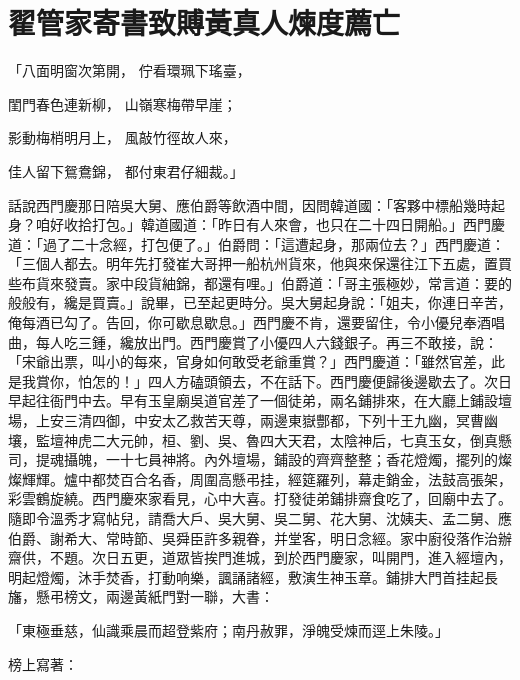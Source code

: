 %

\chapter{翟管家寄書致賻\KG 黃真人煉度薦亡}


\begin{showcontents}{}




「八面明窗次第開，  佇看環珮下瑤臺，

閨門春色連新柳，  山嶺寒梅帶早崖；

影動梅梢明月上，  風敲竹徑故人來，

佳人留下鴛鴦錦，  都付東君仔細裁。」

話說西門慶那日陪吳大舅、應伯爵等飲酒中間，因問韓道國：「客夥中標船幾時起身？咱好收拾打包。」韓道國道：「昨日有人來會，也只在二十四日開船。」西門慶道：「過了二十念經，打包便了。」伯爵問：「這遭起身，那兩位去？」西門慶道：「三個人都去。明年先打發崔大哥押一船杭州貨來，他與來保還往江下五處，置買些布貨來發賣。家中段貨紬錦，都還有哩。」伯爵道：「哥主張極妙，常言道：要的般般有，纔是買賣。」說畢，已至起更時分。吳大舅起身說：「姐夫，你連日辛苦，俺每酒已勾了。告回，你可歇息歇息。」西門慶不肯，還要留住，令小優兒奉酒唱曲，每人吃三鍾，纔放出門。西門慶賞了小優四人六錢銀子。再三不敢接，說：「宋爺出票，叫小的每來，官身如何敢受老爺重賞？」西門慶道：「雖然官差，此是我賞你，怕怎的！」四人方磕頭領去，不在話下。西門慶便歸後邊歇去了。次日早起往衙門中去。早有玉皇廟吳道官差了一個徒弟，兩名鋪排來，在大廳上鋪設壇場，上安三清四御，中安太乙救苦天尊，兩邊東嶽酆都，下列十王九幽，冥曹幽壤，監壇神虎二大元帥，桓、劉、吳、魯四大天君，太陰神后，七真玉女，倒真懸司，提魂攝魄，一十七員神將。內外壇場，鋪設的齊齊整整；香花燈燭，擺列的燦燦輝輝。爐中都焚百合名香，周圍高懸弔挂，經筵羅列，幕走銷金，法鼓高張架，彩雲鶴旋繞。西門慶來家看見，心中大喜。打發徒弟鋪排齋食吃了，回廟中去了。隨即令溫秀才寫帖兒，請喬大戶、吳大舅、吳二舅、花大舅、沈姨夫、孟二舅、應伯爵、謝希大、常時節、吳舜臣許多親眷，并堂客，明日念經。家中廚役落作治辦齋供，不題。次日五更，道眾皆挨門進城，到於西門慶家，叫開門，進入經壇內，明起燈燭，沐手焚香，打動响樂，諷誦諸經，敷演生神玉章。鋪排大門首挂起長旛，懸弔榜文，兩邊黃紙門對一聯，大書：

「東極垂慈，仙識乘晨而超登紫府；南丹赦罪，淨魄受煉而逕上朱陵。」

榜上寫著：


\end{showcontents}
